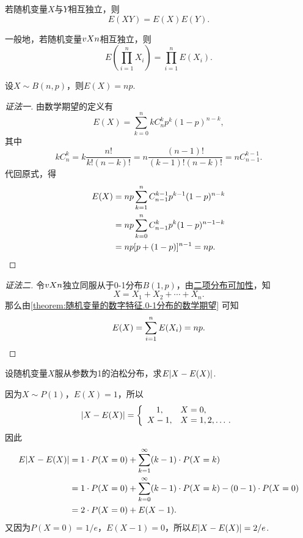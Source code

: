 \begin{property}\label{theorem:随机变量的数字特征.数学期望的性质3}
若随机变量\(X\)与\(Y\)相互独立，则\[
E(X Y) = E(X) E(Y).
\]

一般地，若随机变量\(v{X}{n}\)相互独立，则\[
E\left( \prod_{i=1}^n{X_i} \right)
= \prod_{i=1}^n{E(X_i)}.
\]
\end{property}

\begin{theorem}
设\(X \sim B(n,p)\)，则\(E(X) = np\).
\begin{proof}[证法一]
由数学期望的定义有\[
E(X) = \sum\limits_{k=0}^n k C_n^k p^k (1-p)^{n-k},
\]其中\[
k C_n^k = k \frac{n!}{k! (n-k)!}
= n \frac{(n-1)!}{(k-1)! (n-k)!}
= n C_{n-1}^{k-1}.
\]代回原式，得\begin{align*}
E(X) &= np \sum\limits_{k=1}^n C_{n-1}^{k-1} p^{k-1} (1-p)^{n-k} \\
&= np \sum\limits_{k=0}^n C_{n-1}^k p^k (1-p)^{n-1-k} \\
&= np[p+(1-p)]^{n-1} = np.
\qedhere
\end{align*}
\end{proof}
\begin{proof}[证法二]
令\(v{X}{n}\)独立同服从于0-1分布\(B(1,p)\)，由\hyperref[theorem:多维随机变量及其分布.二项分布的可加性3]{二项分布可加性}，知\[
X = X_1 + X_2 + \dotsb + X_n.
\]那么由\cref{theorem:随机变量的数字特征.0-1分布的数学期望} 可知\[
E(X) = \sum\limits_{i=1}^n E(X_i) = np.
\qedhere
\]
\end{proof}
\end{theorem}

\begin{example}
设随机变量\(X\)服从参数为1的泊松分布，求\(E\abs{X-E(X)}\).
\begin{solution}
因为\(X \sim P(1)\)，\(E(X) = 1\)，所以\[
\abs{X-E(X)} = \left\{ \begin{array}{cl}
1, & X=0, \\
X - 1, & X=1,2,\dotsc.
\end{array} \right.
\]因此\begin{align*}
E\abs{X-E(X)}
&= 1 \cdot P(X=0)
+ \sum\limits_{k=1}^\infty (k-1) \cdot P(X=k) \\
&= 1 \cdot P(X=0)
+ \sum\limits_{k=0}^\infty (k-1) \cdot P(X=k)
- (0-1) \cdot P(X=0) \\
&= 2 \cdot P(X=0)
+ E(X-1).
\end{align*}
又因为\(P(X=0)=1/e\)，\(E(X-1) = 0\)，所以\(E\abs{X-E(X)} = 2/e\).
\end{solution}
\end{example}

